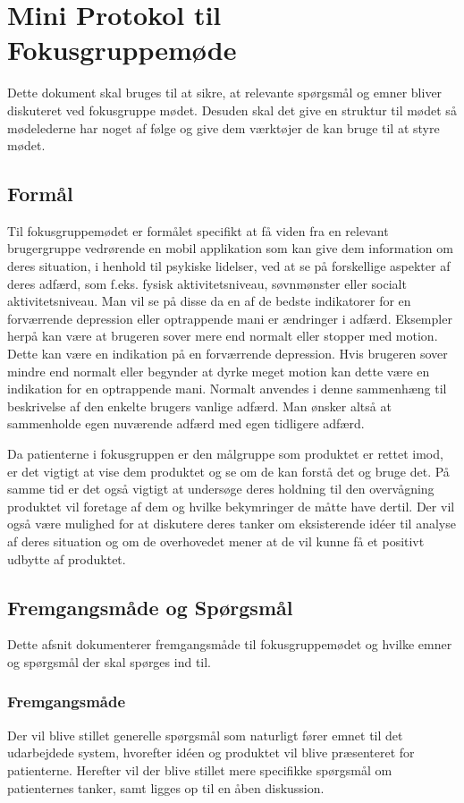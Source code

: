 \chapter*{Mini Protokol til Fokusgruppemøde}
Dette dokument skal bruges til at sikre, at relevante spørgsmål og emner bliver diskuteret ved fokusgruppe mødet.
Desuden skal det give en struktur til mødet så mødelederne har noget af følge og give dem værktøjer de kan bruge til at styre mødet.

\section*{Formål}
Til fokusgruppemødet er formålet specifikt at få viden fra en relevant brugergruppe vedrørende en mobil applikation som kan give dem information om deres situation, i henhold til psykiske lidelser, ved at se på forskellige aspekter af deres adfærd, som f.eks. fysisk aktivitetsniveau, søvnmønster eller socialt aktivitetsniveau. 
Man vil se på disse da en af de bedste indikatorer for en forværrende depression eller optrappende mani er ændringer i adfærd.
Eksempler herpå kan være at brugeren sover mere end normalt eller stopper med motion.
Dette kan være en indikation på en forværrende depression.
Hvis brugeren sover mindre end normalt eller begynder at dyrke meget motion kan dette være en indikation for en optrappende mani.
Normalt anvendes i denne sammenhæng til beskrivelse af den enkelte brugers vanlige adfærd.
Man ønsker altså at sammenholde egen nuværende adfærd med egen tidligere adfærd.
 
Da patienterne i fokusgruppen er den målgruppe som produktet er rettet imod, er det vigtigt at vise dem produktet og se om de kan forstå det og bruge det.
På samme tid er det også vigtigt at undersøge deres holdning til den overvågning produktet vil foretage af dem og hvilke bekymringer de måtte have dertil.
Der vil også være mulighed for at diskutere deres tanker om eksisterende idéer til analyse af deres situation og om de overhovedet mener at de vil kunne få et positivt udbytte af produktet.

\section*{Fremgangsmåde og Spørgsmål}
Dette afsnit dokumenterer fremgangsmåde til fokusgruppemødet og hvilke emner og spørgsmål der skal spørges ind til.

\subsection*{Fremgangsmåde}
Der vil blive stillet generelle spørgsmål som naturligt fører emnet til det udarbejdede system, hvorefter idéen og produktet vil blive præsenteret for patienterne. 
Herefter vil der blive stillet mere specifikke spørgsmål om patienternes tanker, samt ligges op til en åben diskussion.


